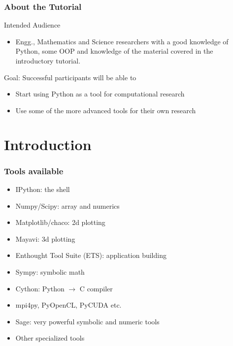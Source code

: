 \documentclass[14pt,compress]{beamer}
\begin{document}
\begin{frame}
  \frametitle{About the Tutorial}
  \begin{block}{Intended Audience}
  \begin{itemize}
       \item Engg., Mathematics and Science researchers with a
           good knowledge of Python, some OOP and knowledge of the material
           covered in the introductory tutorial.
  \end{itemize}
  \end{block}  

  \begin{block}{Goal: Successful participants will be able to}
    \begin{itemize}
      \item Start using Python as a tool for computational research

      \item Use some of the more advanced tools for their own research

    \end{itemize}
  \end{block}
\end{frame}

\section{Introduction}

\begin{frame}
    \frametitle{Tools available}
    \begin{itemize}
        \item IPython: the shell
        \item Numpy/Scipy: array and numerics
        \item Matplotlib/chaco: 2d plotting
        \item Mayavi: 3d plotting
        \item Enthought Tool Suite (ETS): application building
        \item Sympy: symbolic math 
        \item Cython: Python $\rightarrow$ C compiler 
        \item mpi4py, PyOpenCL, PyCUDA etc. 
            
            \vspace*{0.2in}
        \item Sage: very powerful symbolic and numeric tools
        \item Other specialized tools 

    \end{itemize}
\end{frame}
\end{document}
